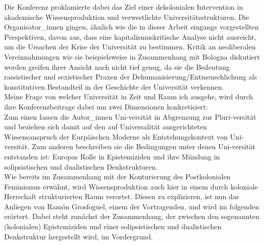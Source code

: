 \noindent Die Konferenz proklamierte dabei das Ziel einer dekolonialen
Intervention in akademische Wissensproduktion und verwestlichte
Universitätsstrukturen. Die Organisator\_innen gingen, ähnlich wie die in dieser
Arbeit eingangs vorgestellten Perspektiven, davon aus, dass eine
kapitalismuskritische Analyse nicht ausreicht, um die Ursachen der Krise der
Universität zu bestimmen. Kritik an neoliberalen Vereinnahmungen wie sie
beispielsweise in Zusammenhang mit Bologna diskutiert werden\footnotemark
{} greifen ihrer
Ansicht nach nicht tief genug, da sie die Bedeutung rassistischer und
sexistischer Praxen der Dehumanisierung/Entmenschlichung als konstitutiven
Bestandteil in der Geschichte der Universität verkennen.\\

\noindent Meine Frage von
welcher Universität in Zeit und Raum ich ausgehe, wird durch ihre
Konferenzbeitrage dabei um zwei Dimensionen konkretisiert:\\
 Zum einen fassen die
Autor\_innen Uni-versität in Abgrenzung zur Pluri-versität und beziehen sich
damit auf den auf Universalität ausgerichteten Wissensanspruch der Eurpäischen
Moderne als Entstehungskontext von Uni-versität. Zum anderen beschreiben sie
die Bedingungen unter denen Uni-versität entstanden ist: Europas Rolle in
Epistemiziden und ihre Mündung in solipsistischen und dualistischen
Denkstrukturen. \\
Wie bereits im Zusammenhang mit der Konturierung des
Postkolonialen Feminismus erwähnt, wird Wissensproduktion auch hier in einem
durch koloniale Herrschaft strukturierten Raum verortet. Diesen zu explizieren,
ist nun das Anliegen von Ramón Grosfoguel, einem der Vortragenden, und wird im
folgenden erörtert.\footnotemark {} Dabei steht zunächst der Zusammenhang, der zwischen
den sogenannten (kolonialen) Epistemiziden und einer solipsistischen und
dualistischen Denkstruktur hergestellt wird, im Vordergrund.\\ 

